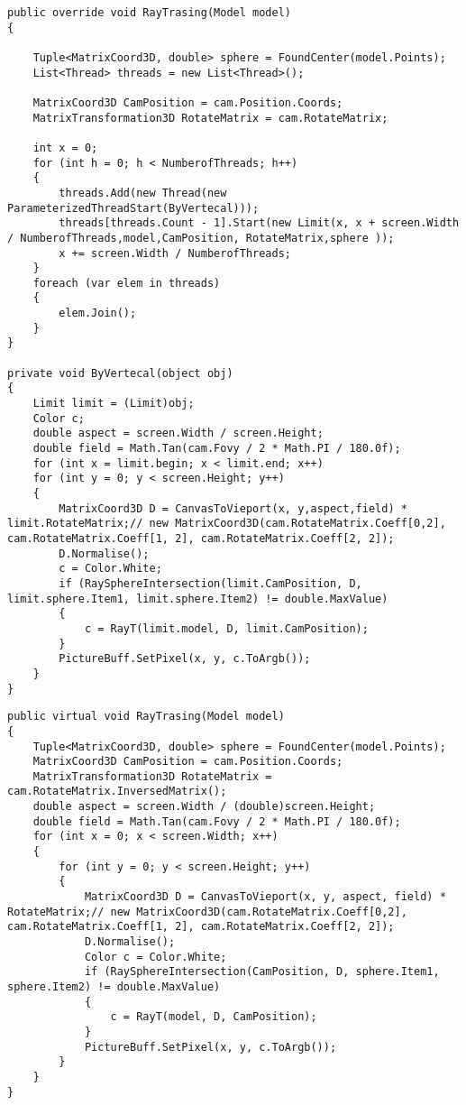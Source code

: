 \begin{center}
\begin{lstlisting}[label=parallel_traise, caption={Алгоритм паралельной трассировки}]
        public override void RayTrasing(Model model)
{
	
	Tuple<MatrixCoord3D, double> sphere = FoundCenter(model.Points);
	List<Thread> threads = new List<Thread>();
	
	MatrixCoord3D CamPosition = cam.Position.Coords;
	MatrixTransformation3D RotateMatrix = cam.RotateMatrix;
	
	int x = 0;
	for (int h = 0; h < NumberofThreads; h++)
	{
		threads.Add(new Thread(new ParameterizedThreadStart(ByVertecal)));
		threads[threads.Count - 1].Start(new Limit(x, x + screen.Width / NumberofThreads,model,CamPosition, RotateMatrix,sphere ));
		x += screen.Width / NumberofThreads;
	}
	foreach (var elem in threads)
	{
		elem.Join();
	}
}

private void ByVertecal(object obj)
{
	Limit limit = (Limit)obj;
	Color c;
	double aspect = screen.Width / screen.Height;
	double field = Math.Tan(cam.Fovy / 2 * Math.PI / 180.0f);
	for (int x = limit.begin; x < limit.end; x++)
	for (int y = 0; y < screen.Height; y++)
	{
		MatrixCoord3D D = CanvasToVieport(x, y,aspect,field) * limit.RotateMatrix;// new MatrixCoord3D(cam.RotateMatrix.Coeff[0,2], cam.RotateMatrix.Coeff[1, 2], cam.RotateMatrix.Coeff[2, 2]);
		D.Normalise();
		c = Color.White;
		if (RaySphereIntersection(limit.CamPosition, D, limit.sphere.Item1, limit.sphere.Item2) != double.MaxValue)
		{
			c = RayT(limit.model, D, limit.CamPosition);
		}
		PictureBuff.SetPixel(x, y, c.ToArgb());
	}
}
\end{lstlisting}
\end{center}
\newpage
\begin{center}
\begin{lstlisting}[label=traise,caption = { Алгоритм последовательной трассировки}]
        public virtual void RayTrasing(Model model)
{
	Tuple<MatrixCoord3D, double> sphere = FoundCenter(model.Points);
	MatrixCoord3D CamPosition = cam.Position.Coords;
	MatrixTransformation3D RotateMatrix = cam.RotateMatrix.InversedMatrix();
	double aspect = screen.Width / (double)screen.Height;
	double field = Math.Tan(cam.Fovy / 2 * Math.PI / 180.0f);
	for (int x = 0; x < screen.Width; x++)
	{
		for (int y = 0; y < screen.Height; y++)
		{
			MatrixCoord3D D = CanvasToVieport(x, y, aspect, field) * RotateMatrix;// new MatrixCoord3D(cam.RotateMatrix.Coeff[0,2], cam.RotateMatrix.Coeff[1, 2], cam.RotateMatrix.Coeff[2, 2]);
			D.Normalise();
			Color c = Color.White;
			if (RaySphereIntersection(CamPosition, D, sphere.Item1, sphere.Item2) != double.MaxValue)
			{
				c = RayT(model, D, CamPosition);
			}
			PictureBuff.SetPixel(x, y, c.ToArgb());
		}
	}
}

\end{lstlisting}
\end{center}
